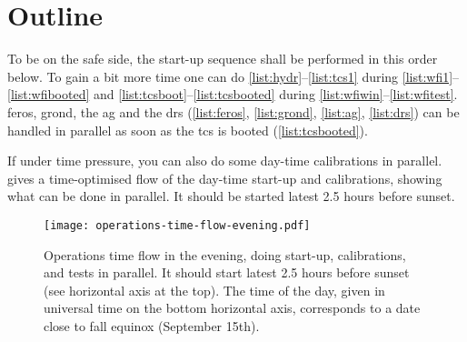 \documentclass[11pt,fleqn,a4paper]{book}
\begin{document}
\section{Outline}
\label{sec:startupoutline}

To be on the safe side, the start-up sequence shall be performed in this order below. To gain a bit more time one can do \ref{list:hydr}--\ref{list:tcs1} during \ref{list:wfi1}--\ref{list:wfibooted} and
\ref{list:tcsboot}--\ref{list:tcsbooted} during
\ref{list:wfiwin}--\ref{list:wfitest}.  \gls{feros}, \gls{grond}, the \acrlong{ag} and the \acrlong{drs} (\ref{list:feros}, \ref{list:grond}, \ref{list:ag}, \ref{list:drs}) can be handled in parallel as soon as the \gls{tcs} is booted
(\ref{list:tcsbooted}).  

If under time pressure, you can also do some day-time calibrations in parallel.  gives a time-optimised flow of the day-time start-up and calibrations, showing what can be done in parallel.  It should be started latest 2.5 hours before sunset.
\begin{figure}
\texttt{[image: operations-time-flow-evening.pdf]}
\caption[Time-flow of afternoon operations]{Operations time flow in the evening, doing start-up, calibrations, and tests in parallel.  It should start latest 2.5 hours before sunset (see horizontal axis at the top).  The time of the day, given in universal time on the bottom horizontal axis, corresponds to a date close to fall equinox (September 15th).}
\label{fig:timeflow-eve}
\end{figure}
\end{document}
